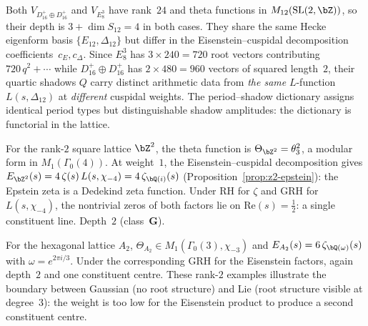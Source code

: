 \begin{computation}
\label{comp:period-shadow-rank24-comparison}
\ClaimStatusProvedHere
Both $V_{D_{16}^+ \oplus D_{16}^+}$ and $V_{E_8^3}$
have rank~$24$ and theta functions in $M_{12}(\mathrm{SL}(2,\bZ))$,
so their depth is $3 + \dim S_{12} = 4$ in both cases.
They share the same Hecke eigenform basis $\{E_{12}, \Delta_{12}\}$
but differ in the Eisenstein--cuspidal decomposition
coefficients~$c_E, c_\Delta$. Since $E_8^3$ has $3\times 240 = 720$
root vectors contributing $720\,q^2 + \cdots$ while
$D_{16}^+\oplus D_{16}^+$ has $2\times 480 = 960$
vectors of squared length~$2$, their quartic shadows $Q$ carry distinct
arithmetic data from \emph{the same} $L$-function
$L(s,\Delta_{12})$ at \emph{different} cuspidal weights.
The period--shadow dictionary assigns identical period types but
distinguishable shadow amplitudes: the dictionary is functorial
in the lattice.
\end{computation}

\begin{computation}
\label{comp:period-shadow-rank2}
\ClaimStatusProvedHere
For the rank-$2$ square lattice $\bZ^2$, the theta function is
$\Theta_{\bZ^2} = \theta_3^2$, a modular form in
$M_1(\Gamma_0(4))$. At weight~$1$, the Eisenstein--cuspidal
decomposition gives
$E_{\bZ^2}(s) = 4\,\zeta(s)\,L(s,\chi_{-4})
= 4\,\zeta_{\bQ(i)}(s)$
(Proposition~\textup{\ref{prop:z2-epstein}}): the Epstein zeta is
a Dedekind zeta function. Under RH for $\zeta$ and GRH for
$L(s,\chi_{-4})$, the nontrivial zeros of both factors lie on
$\mathrm{Re}(s) = \frac12$: a single constituent line.
Depth~$2$ (class~$\mathbf{G}$).

For the hexagonal lattice $A_2$, $\Theta_{A_2} \in
M_1(\Gamma_0(3),\chi_{-3})$ and
$E_{A_2}(s) = 6\,\zeta_{\bQ(\omega)}(s)$ with
$\omega = e^{2\pi i/3}$.
Under the corresponding GRH for the Eisenstein factors, again
depth~$2$ and one constituent centre. These rank-$2$ examples
illustrate the boundary between Gaussian (no root structure)
and Lie (root structure visible at degree~$3$): the weight is too
low for the Eisenstein product to produce a second constituent centre.
\end{computation}

